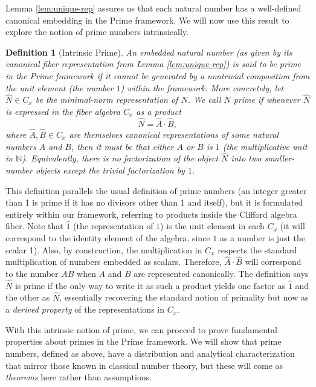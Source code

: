 \documentclass[11pt]{article}
\newtheorem{definition}{Definition}[section]
\begin{document}
Lemma \ref{lem:unique-rep} assures us that each natural number has a well-defined canonical embedding in the Prime framework. We will now use this result to explore the notion of prime numbers intrinsically.

\begin{definition}[Intrinsic Prime]\label{def:prime}
An embedded natural number (as given by its canonical fiber representation from Lemma \ref{lem:unique-rep}) is said to be \emph{prime} in the Prime framework if it cannot be generated by a nontrivial composition from the unit element (the number $1$) within the framework. More concretely, let $\hat{N} \in C_x$ be the minimal-norm representation of $N$. We call $N$ \emph{prime} if whenever $\hat{N}$ is expressed in the fiber algebra $C_x$ as a product 
\[\hat{N} = \hat{A} \cdot \hat{B},\] 
where $\hat{A}, \hat{B} \in C_x$ are themselves canonical representations of some natural numbers $A$ and $B$, then it must be that either $A$ or $B$ is $1$ (the multiplicative unit in $\mathbb{N}$). Equivalently, there is no factorization of the object $\hat{N}$ into two smaller-number objects except the trivial factorization by $1$.
\end{definition}

This definition parallels the usual definition of prime numbers (an integer greater than 1 is prime if it has no divisors other than 1 and itself), but it is formulated entirely within our framework, referring to products inside the Clifford algebra fiber. Note that $\hat{1}$ (the representation of $1$) is the unit element in each $C_x$ (it will correspond to the identity element of the algebra, since $1$ as a number is just the scalar 1). Also, by construction, the multiplication in $C_x$ respects the standard multiplication of numbers embedded as scalars. Therefore, $\hat{A}\cdot \hat{B}$ will correspond to the number $AB$ when $A$ and $B$ are represented canonically. The definition says $\hat{N}$ is prime if the only way to write it as such a product yields one factor as $\hat{1}$ and the other as $\hat{N}$, essentially recovering the standard notion of primality but now as a \emph{derived property} of the representations in $C_x$.

With this intrinsic notion of prime, we can proceed to prove fundamental properties about primes in the Prime framework. We will show that prime numbers, defined as above, have a distribution and analytical characterization that mirror those known in classical number theory, but these will come as \emph{theorems} here rather than assumptions.
\end{document}
